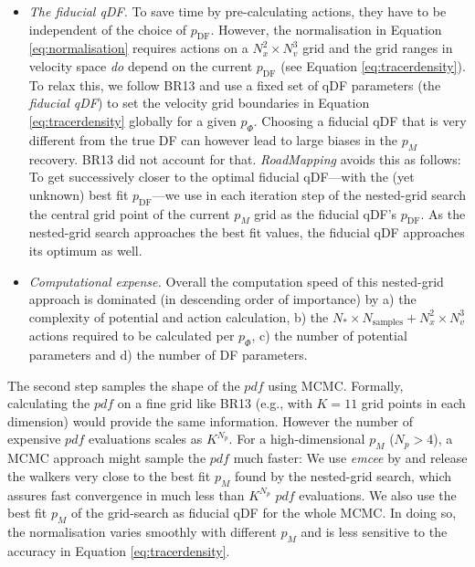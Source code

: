 \documentclass[iop,revtex4,numberedappendix,appendixfloats]{emulateapj}
\newcommand{\pdf}{\ensuremath{pdf}}
\newcommand{\pmodel}{\ensuremath{p_M}}
\newcommand{\RM}{{\sl RoadMapping}}
\begin{document}
\begin{itemize}
\item \emph{The fiducial qDF.} To save time by pre-calculating actions, they have to be independent of the choice of $p_\text{DF}$. However, the normalisation in Equation \eqref{eq:normalisation} requires actions on a $N_x^2 \times N_v^3$ grid and the grid ranges in velocity space \emph{do} depend on the current $p_\text{DF}$ (see Equation \eqref{eq:tracerdensity}). To relax this, we follow BR13 and use a fixed set of qDF parameters (the \emph{fiducial qDF}) to set the velocity grid boundaries in Equation \eqref{eq:tracerdensity} globally for a given $p_\Phi$. Choosing a fiducial qDF that is very different from the true DF can however lead to large biases in the \pmodel{} recovery. BR13 did not account for that. \RM{} avoids this as follows: To get successively closer to the optimal fiducial qDF---with the (yet unknown) best fit $p_\text{DF}$---we use in each iteration step of the nested-grid search the central grid point of the current \pmodel{} grid as the fiducial qDF's $p_\text{DF}$. As the nested-grid search approaches the best fit values, the fiducial qDF approaches its optimum as well. 

\item \emph{Computational expense.} Overall the computation speed of this nested-grid approach is dominated (in descending order of importance) by a) the complexity of potential and action calculation, b) the $N_* \times N_\text{samples} + N_x^2 \times N_v^3$ actions required to be calculated per $p_\Phi$, c) the number of potential parameters and d) the number of DF parameters.
\end{itemize}

The second step samples the shape of the \pdf{} using MCMC. Formally, calculating the \pdf{} on a fine grid like BR13 (e.g., with $K=11$ grid points in each dimension) would provide the same information. However the number of expensive \pdf{} evaluations scales as $K^{N_p}$. For a high-dimensional \pmodel{} ($N_p>4$), a MCMC approach might sample the \pdf{} much faster: We use \emph{emcee} by \citet{2013PASP..125..306F} and release the walkers very close to the best fit \pmodel{} found by the nested-grid search, which assures fast convergence in much less than $K^{N_p}$ \pdf{} evaluations. We also use the best fit \pmodel{} of the grid-search as fiducial qDF for the whole MCMC. In doing so, the normalisation varies smoothly with different $\pmodel{}$ and is less sensitive to the accuracy in Equation \eqref{eq:tracerdensity}.

\end{document}
